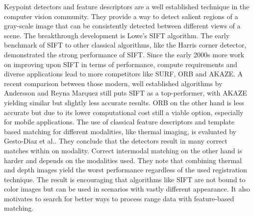 Keypoint detectors and \gls{feature} descriptors are a well established technique in the computer vision community.
They provide a way to detect salient regions of a gray-scale image that can be consistently detected between different views of a scene.
The breakthrough development is Lowe's SIFT\cite{lowe_ijcv04} algorithm.
The early benchmark\cite{mikolajczyk_pami2005} of SIFT to other classical algorithms, like the Harris corner detector\cite{harris_1988}, demonstrated the strong performance of SIFT.
Since the early 2000s more work on improving upon SIFT in terms of performance, compute requirements and diverse applications lead to more competitors like SURF\cite{bay_eccv06}, ORB\cite{rublee_iccv11} and AKAZE\cite{alcantarilla_bmva13}.
A recent comparison between those modern, well established algorithms by Andersson and Reyna Marquez\cite{andersson_2016} still puts SIFT as a top-performer, with AKAZE yielding similar but slightly less accurate results.
ORB\cite{rublee_iccv11} on the other hand is less accurate but due to its lower computational cost still a viable option, especially for mobile applications\cite{andersson_2016}.
The use of classical \gls{feature} descriptors and template based matching for different modalities, like thermal imaging, is evaluated by Gesto-Diaz et al.\cite{gesto-diaz_2017}.
They conclude that the detectors result in many correct matches within on modality.
Correct intermodal matching on the other hand is harder and depends on the modalities used.
They note that combining thermal and depth images yield the worst performance regardless of the used registration technique.
The result is encouraging that algorithms like SIFT\cite{lowe_ijcv04} are not bound to color images but can be used in scenarios with vastly different appearance.
It also motivates to search for better ways to process range data with \gls{feature}-based matching.
